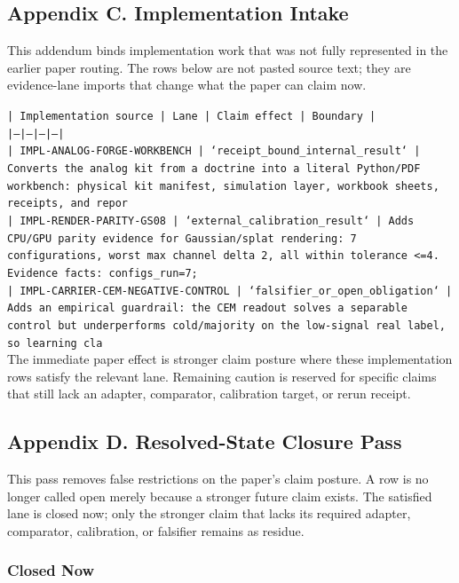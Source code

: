 \documentclass[11pt]{article}
\begin{document}
\subsection*{Appendix C. Implementation Intake}

This addendum binds implementation work that was not fully represented in the earlier paper routing. The rows below are not pasted source text; they are evidence-lane imports that change what the paper can claim now.

\noindent\texttt{| Implementation source | Lane | Claim effect | Boundary |}\\
\noindent\texttt{|---|---|---|---|}\\
\noindent\texttt{| IMPL-ANALOG-FORGE-WORKBENCH | `receipt\_bound\_internal\_result` | Converts the analog kit from a doctrine into a literal Python/PDF workbench: physical kit manifest, simulation layer, workbook sheets, receipts, and repor}\\
\noindent\texttt{| IMPL-RENDER-PARITY-GS08 | `external\_calibration\_result` | Adds CPU/GPU parity evidence for Gaussian/splat rendering: 7 configurations, worst max channel delta 2, all within tolerance <=4. Evidence facts: configs\_run=7;}\\
\noindent\texttt{| IMPL-CARRIER-CEM-NEGATIVE-CONTROL | `falsifier\_or\_open\_obligation` | Adds an empirical guardrail: the CEM readout solves a separable control but underperforms cold/majority on the low-signal real label, so learning cla}\\

The immediate paper effect is stronger claim posture where these implementation rows satisfy the relevant lane. Remaining caution is reserved for specific claims that still lack an adapter, comparator, calibration target, or rerun receipt.

\subsection*{Appendix D. Resolved-State Closure Pass}

This pass removes false restrictions on the paper's claim posture. A row is no longer called open merely because a stronger future claim exists. The satisfied lane is closed now; only the stronger claim that lacks its required adapter, comparator, calibration, or falsifier remains as residue.

\subsubsection*{Closed Now}
\end{document}
